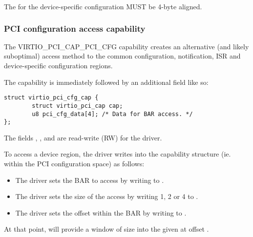 The  for the device-specific configuration MUST be 4-byte aligned.

\subsubsection{PCI configuration access capability}\label{sec:Virtio Transport Options / Virtio Over PCI Bus / PCI Device Layout / PCI configuration access capability}

The VIRTIO_PCI_CAP_PCI_CFG capability
creates an alternative (and likely suboptimal) access method to the
common configuration, notification, ISR and device-specific configuration regions.

The capability is immediately followed by an additional field like so:

\begin{lstlisting}
struct virtio_pci_cfg_cap {
        struct virtio_pci_cap cap;
        u8 pci_cfg_data[4]; /* Data for BAR access. */
};
\end{lstlisting}

The fields , ,  and
 are read-write (RW) for the driver.

To access a device region, the driver writes into the capability
structure (ie. within the PCI configuration space) as follows:

\begin{itemize}
\item The driver sets the BAR to access by writing to .

\item The driver sets the size of the access by writing 1, 2 or 4 to
  .

\item The driver sets the offset within the BAR by writing to
  .
\end{itemize}

At that point,  will provide a window of size
 into the given  at offset .


